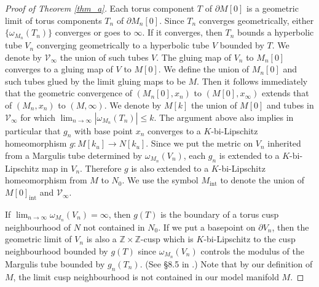 \documentclass{amsart}
\theoremstyle{definition}
\numberwithin{figure}{section}
\numberwithin{equation}{section}
\newcommand{\blackboard}[1]{\ensuremath{\mathbb{#1}}}
\newcommand{\integers}{\blackboard{Z}} %
\def\cv{\mathcal{V}}
\def\part{\partial}
\begin{document}
\begin{proof}[Proof of Theorem \ref{thm_a}]
Each torus component $T$ of $\part M[0]$ is a geometric limit of torus components $T_n$ of $\part M_n[0]$.
Since $T_n$ converges geometrically,  either $\{\omega_{M_n}(T_n)\}$ converges or goes to $\infty$.
If it converges, then $T_n$ bounds a hyperbolic tube $V_n$ converging geometrically to a hyperbolic tube $V$ bounded by $T$.
We denote by $\cv_\infty$ the union of such tubes $V$.
The gluing map of $V_n$ to $M_n[0]$ converges to a gluing map of $V$ to $M[0]$.
We define the union of $M_n[0]$ and such tubes glued by the limit gluing maps to be $M$.
Then it follows immediately that the geometric convergence of $(M_n[0], x_n)$ to $(M[0], x_\infty)$ extends that of $(M_n, x_n)$ to $(M, \infty)$.
We denote by $M[k]$ the union of $M[0]$ and tubes in $\cv_\infty$ for which $\lim_{n \rightarrow \infty} |\omega_{M_n}(T_n)| \leq k$.
The argument above also implies in particular that $g_n$ with base point $x_n$ converges to a $K$-bi-Lipschitz homeomorphism $g: M[k_u] \rightarrow N[k_u]$.
Since we put the metric on $V_n$ inherited from a Margulis tube determined by $\omega_{M_n}(V_n)$, each $g_n$ is extended to a $K$-bi-Lipschitz map in $V_n$.
Therefore $g$ is also extended to a $K$-bi-Lipschitz homeomorphism from $M$ to $N_0$.
We use the symbol $M_\mathrm{int}$ to denote the union of $M[0]_\mathrm{int}$ and $\cv_\infty$.

If $\lim_{n\to \infty}{\omega_{M_n}(V_n)}=\infty$, then $g(T)$ is the boundary of a torus cusp neighbourhood of $N$ not contained in $N_0$.
If we put a basepoint on $\partial V_n$, then the geometric limit of $V_n$ is also a $\integers \times \integers$-cusp which is $K$-bi-Lipschitz to the cusp neighbourhood bounded by $g(T)$ since $\omega_{M_n}(V_n)$ controls the modulus of the Margulis tube bounded by $g_n(T_n)$.
(See \S8.5 in \cite{bcm}.)
Note that by our definition of $M$, the limit cusp neighbourhood is not contained in our model manifold $M$.


\end{proof}
\end{document}
